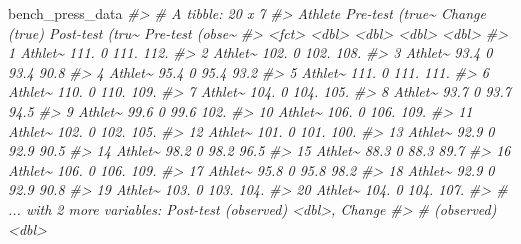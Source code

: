 \documentclass[
]{book}
\newenvironment{Shaded}{\begin{snugshade}}{\end{snugshade}}
\newcommand{\CommentTok}[1]{\textcolor[rgb]{0.56,0.35,0.01}{\textit{#1}}}
\newcommand{\NormalTok}[1]{#1}
\begin{document}
\begin{Shaded}
\begin{Highlighting}[]
\NormalTok{bench\_press\_data}
\CommentTok{\#> \# A tibble: 20 x 7}
\CommentTok{\#>    Athlete \textasciigrave{}Pre{-}test (true\textasciitilde{} \textasciigrave{}Change (true)\textasciigrave{} \textasciigrave{}Post{-}test (tru\textasciitilde{} \textasciigrave{}Pre{-}test (obse\textasciitilde{}}
\CommentTok{\#>    <fct>              <dbl>           <dbl>            <dbl>            <dbl>}
\CommentTok{\#>  1 Athlet\textasciitilde{}            111.                0            111.             112. }
\CommentTok{\#>  2 Athlet\textasciitilde{}            102.                0            102.             108. }
\CommentTok{\#>  3 Athlet\textasciitilde{}             93.4               0             93.4             90.8}
\CommentTok{\#>  4 Athlet\textasciitilde{}             95.4               0             95.4             93.2}
\CommentTok{\#>  5 Athlet\textasciitilde{}            111.                0            111.             111. }
\CommentTok{\#>  6 Athlet\textasciitilde{}            110.                0            110.             109. }
\CommentTok{\#>  7 Athlet\textasciitilde{}            104.                0            104.             105. }
\CommentTok{\#>  8 Athlet\textasciitilde{}             93.7               0             93.7             94.5}
\CommentTok{\#>  9 Athlet\textasciitilde{}             99.6               0             99.6            102. }
\CommentTok{\#> 10 Athlet\textasciitilde{}            106.                0            106.             109. }
\CommentTok{\#> 11 Athlet\textasciitilde{}            102.                0            102.             105. }
\CommentTok{\#> 12 Athlet\textasciitilde{}            101.                0            101.             100. }
\CommentTok{\#> 13 Athlet\textasciitilde{}             92.9               0             92.9             90.5}
\CommentTok{\#> 14 Athlet\textasciitilde{}             98.2               0             98.2             96.5}
\CommentTok{\#> 15 Athlet\textasciitilde{}             88.3               0             88.3             89.7}
\CommentTok{\#> 16 Athlet\textasciitilde{}            106.                0            106.             109. }
\CommentTok{\#> 17 Athlet\textasciitilde{}             95.8               0             95.8             98.2}
\CommentTok{\#> 18 Athlet\textasciitilde{}             92.9               0             92.9             90.8}
\CommentTok{\#> 19 Athlet\textasciitilde{}            103.                0            103.             104. }
\CommentTok{\#> 20 Athlet\textasciitilde{}            104.                0            104.             107. }
\CommentTok{\#> \# ... with 2 more variables: \textasciigrave{}Post{-}test (observed)\textasciigrave{} <dbl>, \textasciigrave{}Change}
\CommentTok{\#> \#   (observed)\textasciigrave{} <dbl>}
\end{Highlighting}
\end{Shaded}
\end{document}
